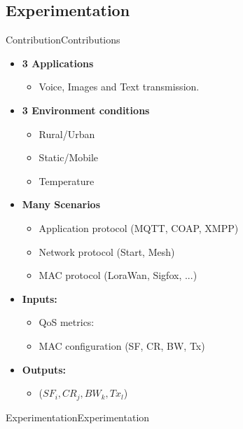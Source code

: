 \subsection{Experimentation}

\begin{frame}{Contribution}{Contributions}
	\begin{itemize}
		\item \textbf{3 Applications}
		\begin{itemize}
			\item Voice, Images and Text transmission.
		\end{itemize}
	\end{itemize}

	\begin{itemize}
		\item \textbf{3 Environment conditions}
		\begin{itemize}
			\item Rural/Urban
			\item Static/Mobile
			\item Temperature
		\end{itemize}
	\end{itemize}

	\begin{itemize}
		\item \textbf{Many Scenarios}
		\begin{itemize}
			\item Application protocol (MQTT, COAP, XMPP)
			\item Network protocol (Start, Mesh)
			\item MAC protocol (LoraWan, Sigfox, ...)
		\end{itemize}

		\item \textbf{Inputs:}
		\begin{itemize}
			\item QoS metrics:
			\item MAC configuration (SF, CR, BW, Tx)
		\end{itemize}

		\item \textbf{Outputs:}
		\begin{itemize}
			\item ($SF_{i}, CR_{j}, BW_{k}, Tx_{l}$)
		\end{itemize}
	\end{itemize}
\end{frame}

\begin{frame}{Experimentation}{Experimentation}

\end{frame}





